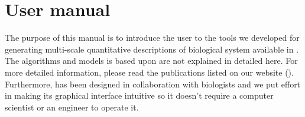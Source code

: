 % 

\section{User manual}
The purpose of this manual is to introduce the user to the tools we developed for generating multi-scale quantitative descriptions of biological system available in \wingj. The algorithms and models \wingj is based upon are not explained in detailed here. For more detailed information, please read the publications listed on our website (\wingjShortUrl).\\

Furthermore, \wingj has been designed in collaboration with biologists and we put effort in making its graphical interface intuitive so it doesn't require a computer scientist or an engineer to operate it.



